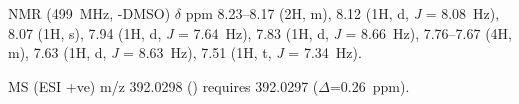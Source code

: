 \begin{refsection}
 NMR (499~MHz, -DMSO) $\delta$ ppm 8.23--8.17 (2H, m), 8.12 (1H, d, \emph{J} = 8.08~Hz), 8.07 (1H, s), 7.94 (1H, d, \emph{J} = 7.64~Hz), 7.83 (1H, d, \emph{J} = 8.66~Hz), 7.76--7.67 (4H, m), 7.63 (1H, d, \emph{J} = 8.63~Hz), 7.51 (1H, t, \emph{J} = 7.34~Hz).

MS (ESI +ve) m/z 392.0298 ()  requires 392.0297 ($\Delta$=0.26~ppm).

\end{refsection}
